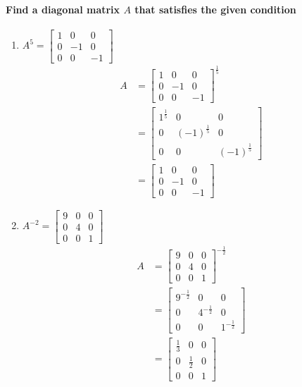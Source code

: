 \documentclass[
  letterpaper,
  DIV=11,
  numbers=noendperiod]{scrartcl}
\let\oldparagraph\paragraph
\renewcommand{\paragraph}[1]{\oldparagraph{#1}\mbox{}}
\providecommand{\tightlist}{%
  \setlength{\itemsep}{0pt}\setlength{\parskip}{0pt}}\usepackage{longtable,booktabs,array}
\begin{document}
\newpage{}

\hypertarget{find-a-diagonal-matrix-a-that-satisfies-the-given-condition}{%
\paragraph{\texorpdfstring{Find a diagonal matrix \(A\) that satisfies
the given
condition}{Find a diagonal matrix A that satisfies the given condition}}\label{find-a-diagonal-matrix-a-that-satisfies-the-given-condition}}

\begin{enumerate}
\def\labelenumi{\arabic{enumi})}
\tightlist
\item
  \(A^5=\begin{bmatrix}1 & 0 & 0 \\ 0 & -1 & 0 \\ 0 & 0 & -1\end{bmatrix}\)
  \begin{align*}
  A &= \begin{bmatrix}1 & 0 & 0 \\ 0 & -1 & 0 \\ 0 & 0 & -1\end{bmatrix}^{\frac{1}{5}} \\
  &= \begin{bmatrix}1^{\frac{1}{5}} & 0 & 0 \\ 0 & (-1)^{\frac{1}{5}} & 0 \\ 0 & 0 & (-1)^{\frac{1}{5}}\end{bmatrix} \\
  &= \begin{bmatrix}1 & 0 & 0 \\ 0 & -1 & 0 \\ 0 & 0 & -1\end{bmatrix}
  \end{align*}
\item
  \(A^{-2}=\begin{bmatrix}9 & 0 & 0 \\ 0 & 4 & 0 \\ 0 & 0 & 1\end{bmatrix}\)
  \begin{align*}
  A &= \begin{bmatrix}9 & 0 & 0 \\ 0 & 4 & 0 \\ 0 & 0 & 1\end{bmatrix}^{-\frac{1}{2}} \\
  &= \begin{bmatrix}9^{-\frac{1}{2}} & 0 & 0 \\ 0 & 4^{-\frac{1}{2}} & 0 \\ 0 & 0 & 1^{-\frac{1}{2}}\end{bmatrix} \\
  &= \begin{bmatrix}\frac{1}{3} & 0 & 0 \\ 0 & \frac{1}{2} & 0 \\ 0 & 0 & 1\end{bmatrix}
  \end{align*}
\end{enumerate}
\end{document}
